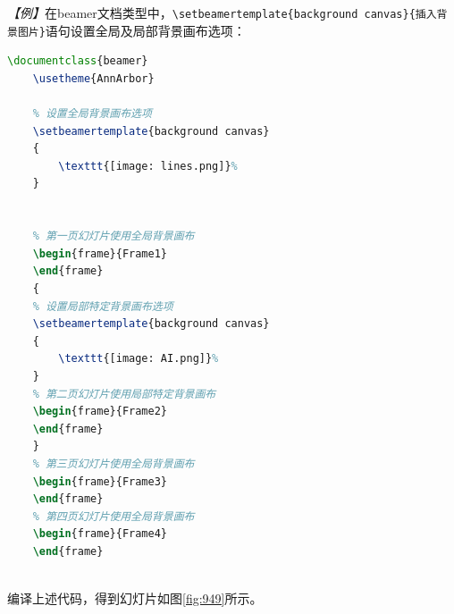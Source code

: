 \emph{【例】}在beamer文档类型中，\texttt{\textbackslash{}setbeamertemplate\{background canvas\}\{插入背景图片\}}语句设置全局及局部背景画布选项：
\begin{lstlisting}[language=TeX]
    \documentclass{beamer}
    \usetheme{AnnArbor}

    % 设置全局背景画布选项
    \setbeamertemplate{background canvas}
    {
        \texttt{[image: lines.png]}%
    }

    
    % 第一页幻灯片使用全局背景画布
    \begin{frame}{Frame1}
    \end{frame}
    {
    % 设置局部特定背景画布选项
    \setbeamertemplate{background canvas}
    {
        \texttt{[image: AI.png]}%
    }
    % 第二页幻灯片使用局部特定背景画布
    \begin{frame}{Frame2}
    \end{frame}
    }
    % 第三页幻灯片使用全局背景画布
    \begin{frame}{Frame3}
    \end{frame}
    % 第四页幻灯片使用全局背景画布
    \begin{frame}{Frame4}
    \end{frame}
    
\end{lstlisting}

编译上述代码，得到幻灯片如图\ref{fig:949}所示。

